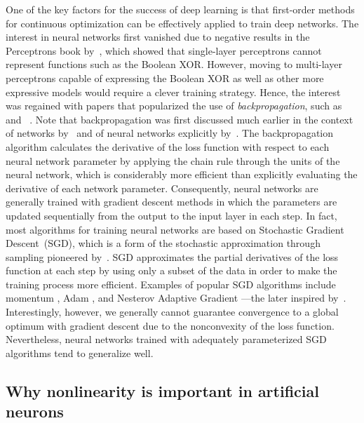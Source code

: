 One of the key factors for the success of deep learning is that first-order methods for continuous  optimization can be effectively applied to train deep networks. 
The interest in neural networks first vanished due to negative results in the Perceptrons book by~\cite{perceptrons}, which showed that single-layer perceptrons cannot represent functions such as the Boolean XOR. 
However, moving to multi-layer perceptrons capable of expressing the Boolean XOR as well as other more expressive models would require a clever training strategy. 
Hence, the interest was regained with papers that popularized the use of \emph{backpropagation}, such as ~\cite{BackPOP1} and ~\cite{BackPOP2}. 
Note that backpropagation was first discussed much earlier in the context of networks by~\cite{BackpropNetworks} and of neural networks explicitly by~\cite{BackpropNN}. 
The backpropagation algorithm calculates the derivative of the loss function with respect to each neural network parameter by applying the chain rule through the units of the neural network, 
which is considerably more efficient than explicitly evaluating the derivative of each network parameter.
Consequently, neural networks are generally trained with gradient descent methods in which the parameters are updated sequentially from the output to the input layer in each step. 
In fact, 
most algorithms for training neural networks are based on Stochastic Gradient Descent~(SGD), 
which is a form of the stochastic approximation through sampling pioneered by~\cite{StochasticApproximation}. 
SGD approximates the partial derivatives of the loss function at each step by using only a subset of the data in order to make the training process more efficient. 
Examples of popular SGD algorithms include momentum \citep{momentum}, Adam \citep{Adam}, and Nesterov Adaptive Gradient \citep{NAG} ---the later inspired by~\cite{Nesterov}. 
Interestingly, 
however, we generally cannot guarantee convergence to a global optimum with gradient descent due to the nonconvexity of the loss function. 
Nevertheless, neural networks trained with adequately parameterized SGD algorithms tend to generalize well. 

\subsection{Why nonlinearity is important in artificial neurons}

